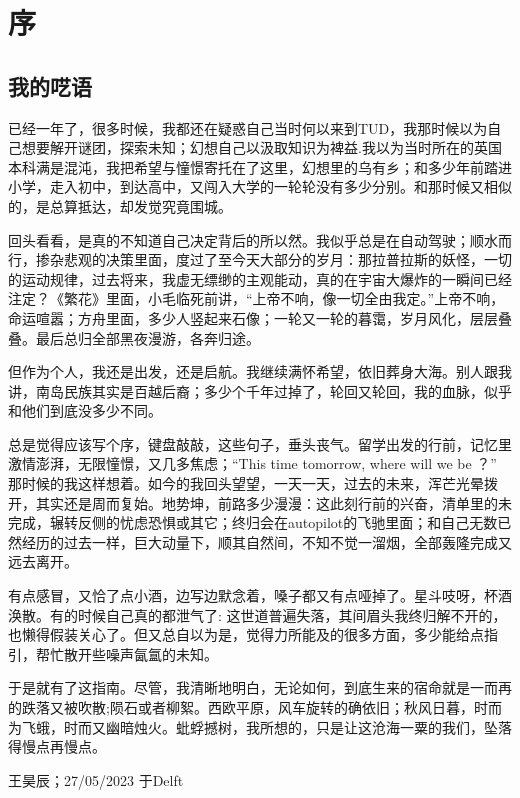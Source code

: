 \chapter{ 序}
\section{我的呓语}
已经一年了，很多时候，我都还在疑惑自己当时何以来到TUD，我那时候以为自己想要解开谜团，探索未知；幻想自己以汲取知识为裨益.我以为当时所在的英国本科满是混沌，我把希望与憧憬寄托在了这里，幻想里的乌有乡；和多少年前踏进小学，走入初中，到达高中，又闯入大学的一轮轮没有多少分别。和那时候又相似的，是总算抵达，却发觉究竟围城。

回头看看，是真的不知道自己决定背后的所以然。我似乎总是在自动驾驶；顺水而行，掺杂悲观的决策里面，度过了至今天大部分的岁月：那拉普拉斯的妖怪，一切的运动规律，过去将来，我虚无缥缈的主观能动，真的在宇宙大爆炸的一瞬间已经注定？《繁花》里面，小毛临死前讲，“上帝不响，像一切全由我定。”上帝不响，命运喧嚣；方舟里面，多少人竖起来石像；一轮又一轮的暮霭，岁月风化，层层叠叠。最后总归全部黑夜漫游，各奔归途。

但作为个人，我还是出发，还是启航。我继续满怀希望，依旧葬身大海。别人跟我讲，南岛民族其实是百越后裔；多少个千年过掉了，轮回又轮回，我的血脉，似乎和他们到底没多少不同。

总是觉得应该写个序，键盘敲敲，这些句子，垂头丧气。留学出发的行前，记忆里激情澎湃，无限憧憬，又几多焦虑；“This time tomorrow, where will we be ？” 那时候的我这样想着。如今的我回头望望，一天一天，过去的未来，浑芒光晕拨开，其实还是周而复始。地势坤，前路多少漫漫：这此刻行前的兴奋，清单里的未完成，辗转反侧的忧虑恐惧或其它；终归会在autopilot的飞驰里面；和自己无数已然经历的过去一样，巨大动量下，顺其自然间，不知不觉一溜烟，全部轰隆完成又远去离开。

有点感冒，又恰了点小酒，边写边默念着，嗓子都又有点哑掉了。星斗吱呀，杯酒涣散。有的时候自己真的都泄气了: 这世道普遍失落，其间眉头我终归解不开的，也懒得假装关心了。但又总自以为是，觉得力所能及的很多方面，多少能给点指引，帮忙散开些噪声氤氲的未知。

于是就有了这指南。尽管，我清晰地明白，无论如何，到底生来的宿命就是一而再的跌落又被吹散;陨石或者柳絮。西欧平原，风车旋转的确依旧；秋风日暮，时而为飞蛾，时而又幽暗烛火。蚍蜉撼树，我所想的，只是让这沧海一粟的我们，坠落得慢点再慢点。
\begin{flushright}
王昊辰；27/05/2023 于Delft
\end{flushright}

\vspace{\betsubsec} %
